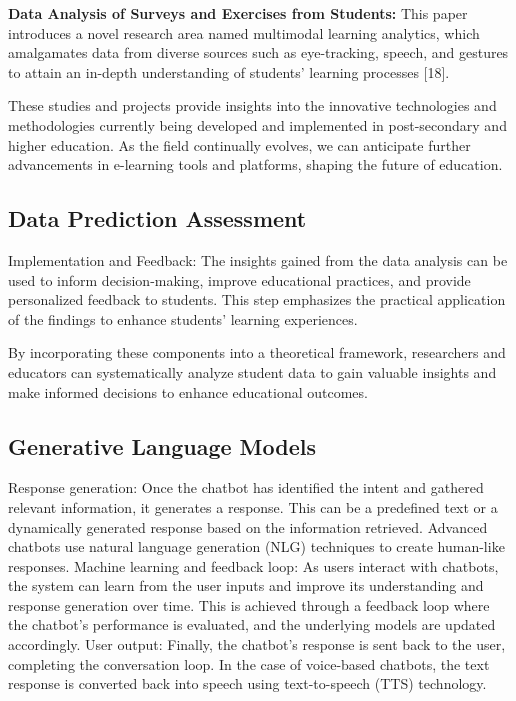 \textbf{Data Analysis of Surveys and Exercises from Students:}
This paper introduces a novel research area named multimodal learning analytics, which amalgamates data from diverse sources such as eye-tracking, speech, and gestures to attain an in-depth understanding of students' learning processes [18].

These studies and projects provide insights into the innovative technologies and methodologies currently being developed and implemented in post-secondary and higher education. As the field continually evolves, we can anticipate further advancements in e-learning tools and platforms, shaping the future of education.









\subsection{Data Prediction Assessment}

Implementation and Feedback: The insights gained from the data analysis can be used to inform decision-making, improve educational practices, and provide personalized feedback to students. This step emphasizes the practical application of the findings to enhance students' learning experiences.


By incorporating these components into a theoretical framework, researchers and educators can systematically analyze student data to gain valuable insights and make informed decisions to enhance educational outcomes.

\subsection{Generative Language Models}

Response generation: Once the chatbot has identified the intent and gathered relevant information, it generates a response. This can be a predefined text or a dynamically generated response based on the information retrieved. Advanced chatbots use natural language generation (NLG) techniques to create human-like responses.
Machine learning and feedback loop: As users interact with chatbots, the system can learn from the user inputs and improve its understanding and response generation over time. This is achieved through a feedback loop where the chatbot's performance is evaluated, and the underlying models are updated accordingly.
User output: Finally, the chatbot's response is sent back to the user, completing the conversation loop. In the case of voice-based chatbots, the text response is converted back into speech using text-to-speech (TTS) technology.



